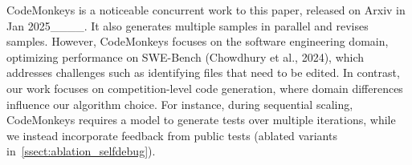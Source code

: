 


CodeMonkeys is a noticeable concurrent work to this paper, released on Arxiv in Jan 2025____. It also generates multiple samples in parallel and revises samples. However, CodeMonkeys focuses on the software engineering domain, optimizing performance on SWE-Bench (Chowdhury et al., 2024),
which addresses challenges such as identifying files
that need to be edited. In contrast, our work focuses on competition-level code generation, where domain differences influence our algorithm choice. For instance, during sequential scaling, CodeMonkeys requires a model to generate tests over multiple iterations, while we instead incorporate feedback from public tests (ablated variants in~\cref{ssect:ablation_selfdebug}).